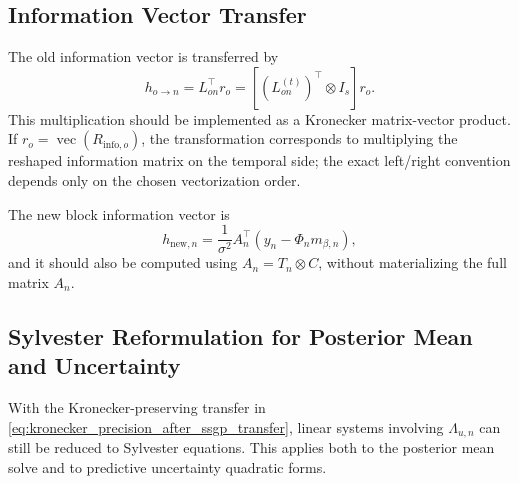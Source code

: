 \documentclass[12pt]{article}
\newcommand{\vecop}{\operatorname{vec}}
\begin{document}
\subsection{Information Vector Transfer}
\label{subsec:information_vector_transfer}

The old information vector is transferred by
\begin{equation}
    h_{o\rightarrow n}
    =
    L_{on}^\top r_o
    =
    \left[
        \left(L_{on}^{(t)}\right)^\top
        \otimes I_s
    \right]r_o.
    \label{eq:kronecker_information_transfer}
\end{equation}
This multiplication should be implemented as a Kronecker matrix-vector product. If
\(r_o=\vecop(R_{\mathrm{info},o})\), the transformation corresponds to multiplying the
reshaped information matrix on the temporal side; the exact left/right convention depends
only on the chosen vectorization order.

The new block information vector is
\begin{equation}
    h_{\mathrm{new},n}
    =
    \frac{1}{\sigma^2}
    A_n^\top
    \left(
        y_n-\Phi_nm_{\beta,n}
    \right),
\end{equation}
and it should also be computed using \(A_n=T_n\otimes C\), without materializing the full
matrix \(A_n\).

\subsection{Sylvester Reformulation for Posterior Mean and Uncertainty}
\label{subsec:sylvester_reformulation}

With the Kronecker-preserving transfer in
\eqref{eq:kronecker_precision_after_ssgp_transfer}, linear systems involving
\(\Lambda_{u,n}\) can still be reduced to Sylvester equations. This applies both to the
posterior mean solve and to predictive uncertainty quadratic forms.
\end{document}
